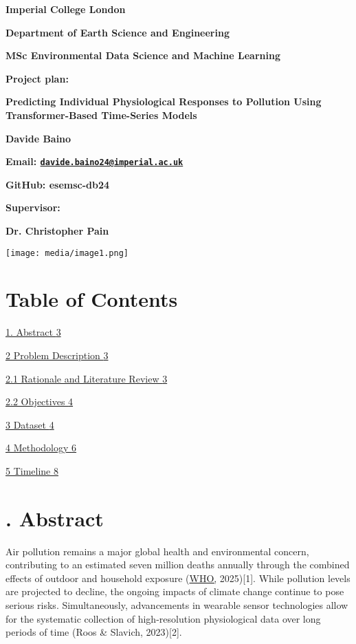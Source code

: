 \documentclass[
]{article}
\author{}
\date{}
\begin{document}
\textbf{Imperial College London}

\textbf{Department of Earth Science and Engineering}

\textbf{MSc Environmental Data Science and Machine Learning}

\textbf{Project plan:}

\textbf{Predicting Individual Physiological Responses to Pollution Using
Transformer-Based Time-Series Models}

\textbf{Davide Baino}

\textbf{Email:
\href{mailto:davide.baino24@imperial.ac.uk}{\nolinkurl{davide.baino24@imperial.ac.uk}}}

\textbf{GitHub: esemsc-db24}

\textbf{Supervisor:}

\textbf{Dr. Christopher Pain}

\texttt{[image: media/image1.png]}

\hypertarget{table-of-contents}{%
\section{Table of Contents}\label{table-of-contents}}

\protect\hyperlink{abstract}{1. Abstract
\protect\hyperlink{abstract}{3}}

\protect\hyperlink{problem-description}{2 Problem Description
\protect\hyperlink{problem-description}{3}}

\protect\hyperlink{rationale-and-literature-review}{2.1 Rationale and
Literature Review
\protect\hyperlink{rationale-and-literature-review}{3}}

\protect\hyperlink{objectives}{2.2 Objectives
\protect\hyperlink{objectives}{4}}

\protect\hyperlink{dataset}{3 Dataset \protect\hyperlink{dataset}{4}}

\protect\hyperlink{methodology}{4 Methodology
\protect\hyperlink{methodology}{6}}

\protect\hyperlink{timeline}{5 Timeline \protect\hyperlink{timeline}{8}}

\hypertarget{abstract}{%
\section{\texorpdfstring{\hfill{}. Abstract}{ 1. Abstract}}\label{abstract}}

Air pollution remains a major global health and environmental concern,
contributing to an estimated seven million deaths annually through the
combined effects of outdoor and household exposure
(\href{https://www.who.int/health-topics/air-pollution\#tab=tab_2}{WHO,}
2025){[}1{]}. While pollution levels are projected to decline, the
ongoing impacts of climate change continue to pose serious risks.
Simultaneously, advancements in wearable sensor technologies allow for
the systematic collection of high-resolution physiological data over
long periods of time (Roos \& Slavich, 2023){[}2{]}.
\end{document}
